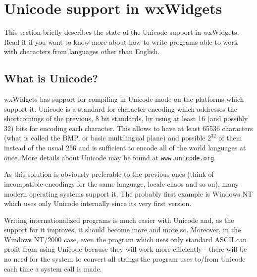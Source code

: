 
\section{Unicode support in wxWidgets}\label{unicode}

This section briefly describes the state of the Unicode support in wxWidgets.
Read it if you want to know more about how to write programs able to work with
characters from languages other than English.

\subsection{What is Unicode?}\label{whatisunicode}

wxWidgets has support for compiling in Unicode mode
on the platforms which support it. Unicode is a standard for character
encoding which addresses the shortcomings of the previous, 8 bit standards, by
using at least 16 (and possibly 32) bits for encoding each character. This
allows to have at least 65536 characters (what is called the BMP, or basic
multilingual plane) and possible $2^{32}$ of them instead of the usual 256 and
is sufficient to encode all of the world languages at once. More details about
Unicode may be found at {\tt www.unicode.org}.


As this solution is obviously preferable to the previous ones (think of
incompatible encodings for the same language, locale chaos and so on), many
modern operating systems support it. The probably first example is Windows NT
which uses only Unicode internally since its very first version.

Writing internationalized programs is much easier with Unicode and, as the
support for it improves, it should become more and more so. Moreover, in the
Windows NT/2000 case, even the program which uses only standard ASCII can profit
from using Unicode because they will work more efficiently - there will be no
need for the system to convert all strings the program uses to/from Unicode
each time a system call is made.

